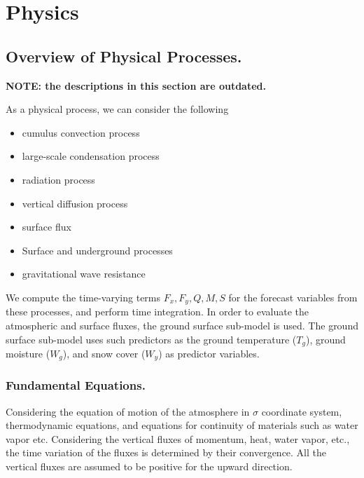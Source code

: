 \hypertarget{physics}{%
\section{Physics}\label{physics}}

\hypertarget{overview-of-physical-processes.}{%
\subsection{Overview of Physical
Processes.}\label{overview-of-physical-processes.}}

\textbf{NOTE: the descriptions in this section are outdated.}

As a physical process, we can consider the following

\begin{itemize}
\item
  cumulus convection process
\item
  large-scale condensation process
\item
  radiation process
\item
  vertical diffusion process
\item
  surface flux
\item
  Surface and underground processes
\item
  gravitational wave resistance
\end{itemize}

We compute the time-varying terms \(F_x, F_y, Q, M, S\) for the forecast
variables from these processes, and perform time integration. In order
to evaluate the atmospheric and surface fluxes, the ground surface
sub-model is used. The ground surface sub-model uses such predictors as
the ground temperature (\(T_g\)), ground moisture (\(W_g\)), and snow
cover (\(W_y\)) as predictor variables.

\hypertarget{fundamental-equations.}{%
\subsubsection{Fundamental Equations.}\label{fundamental-equations.}}

Considering the equation of motion of the atmosphere in \(\sigma\)
coordinate system, thermodynamic equations, and equations for continuity
of materials such as water vapor etc. Considering the vertical fluxes of
momentum, heat, water vapor, etc., the time variation of the fluxes is
determined by their convergence. All the vertical fluxes are assumed to
be positive for the upward direction.

